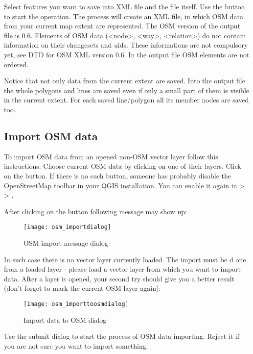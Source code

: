 Select features you want to save into XML file and the file itself. Use 
the  button to start the operation. The process will create an 
XML file, in which OSM data from your current map extent are represented. 
The OSM version of the output file is 0.6. Elements of OSM data 
(<node>, <way>, <relation>) do not contain information on their changesets 
and uids. These informations are not compulsory yet, see DTD for
OSM XML version 0.6. In the output file OSM elements are not ordered.

Notice that not only data from the current extent are saved. Into the output 
file the whole polygons and lines are saved even if only a small part of them 
is visible in the current extent. For each saved line/polygon all its member 
nodes are saved too.

\subsection{Import OSM data}  

To import OSM data from an opened non-OSM vector layer follow this 
instructions: Choose current OSM data by clicking on one of their layers. 
Click on the  button. If 
there is no such button, someone has probably disable the OpenStreetMap 
toolbar in your QGIS installation. You can enable it again in 
 >  > . 

After clicking on the button following message may show up:

\begin{figure}[ht]
   \centering
   \texttt{[image: osm\_importdialog]}   
   \caption{OSM import message dialog \nixcaption}\label{fig:osmimportmessage}
\end{figure}

In such case there is no vector layer currently loaded. The import must be d
one from a loaded layer - please load a vector layer from which you want to 
import data. After a layer is opened, your second try should give you a 
better result (don't forget to mark the current OSM layer again):

\begin{figure}[ht]
   \centering
   \texttt{[image: osm\_importtoosmdialog]}   
   \caption{Import data to OSM dialog \nixcaption}\label{fig:osmimporttoosm}
\end{figure}

Use the submit dialog to start the process of OSM data importing.
Reject it if you are not sure you want to import something.

\FloatBarrier

